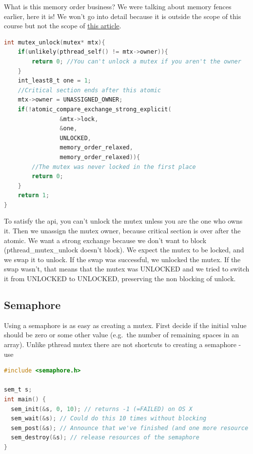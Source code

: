 What is this memory order business?
We were talking about memory fences earlier, here it is!
We won't go into detail because it is outside the scope of this course but not the scope of \href{https://gcc.gnu.org/wiki/Atomic/GCCMM/AtomicSync}{this article}.

\begin{lstlisting}[language=C]
int mutex_unlock(mutex* mtx){
    if(unlikely(pthread_self() != mtx->owner)){
        return 0; //You can't unlock a mutex if you aren't the owner
    }
    int_least8_t one = 1;
    //Critical section ends after this atomic
    mtx->owner = UNASSIGNED_OWNER;
    if(!atomic_compare_exchange_strong_explicit(
                &mtx->lock, 
                &one, 
                UNLOCKED,
                memory_order_relaxed,
                memory_order_relaxed)){
        //The mutex was never locked in the first place
        return 0;
    }
    return 1;
}
\end{lstlisting}

To satisfy the api, you can't unlock the mutex unless you are the one who owns it.
Then we unassign the mutex owner, because critical section is over after the atomic.
We want a strong exchange because we don't want to block (pthread\_mutex\_unlock doesn't block).
We expect the mutex to be locked, and we swap it to unlock.
If the swap was successful, we unlocked the mutex.
If the swap wasn't, that means that the mutex was UNLOCKED and we tried to switch it from UNLOCKED to UNLOCKED, preserving the non blocking of unlock.

\subsection{Semaphore}

Using a semaphore is as easy as creating a mutex.
First decide if the initial value should be zero or some other value (e.g.~the number of remaining spaces in an array).
Unlike pthread mutex there are not shortcuts to creating a semaphore - use 

\begin{lstlisting}[language=C]
#include <semaphore.h>

sem_t s;
int main() {
  sem_init(&s, 0, 10); // returns -1 (=FAILED) on OS X
  sem_wait(&s); // Could do this 10 times without blocking
  sem_post(&s); // Announce that we've finished (and one more resource item is available; increment count)
  sem_destroy(&s); // release resources of the semaphore
}
\end{lstlisting}

